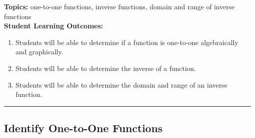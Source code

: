 

\noindent \textbf{Topics:}  one-to-one functions, inverse functions, domain and range of inverse functions\\

\noindent \textbf{Student Learning Outcomes:}
\begin{enumerate}
\item Students will be able to determine if a function is one-to-one algebraically and graphically.
\item Students will be able to determine the inverse of a function.
\item Students will be able to determine the domain and range of an inverse function.
\end{enumerate}

\hrule 

\bigskip

\subsection{Identify One-to-One Functions} ~


\noindent
{}

